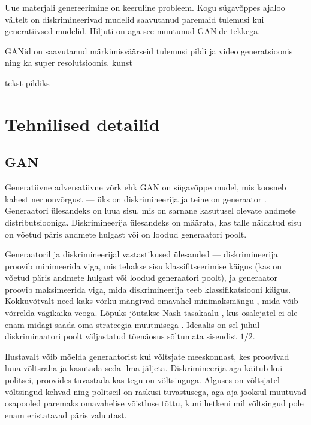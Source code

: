\documentclass{vilgym}
\begin{document}
    Uue materjali genereerimine on keeruline probleem. Kogu sügavõppes ajaloo vältelt on diskrimineerivad mudelid saavutanud paremaid tulemusi kui generatiivsed mudelid. Hiljuti on aga see muutunud GANide tekkega.

    GANid on saavutanud märkimisväärseid tulemusi pildi ja video generatsioonis ning ka super resolutsioonis. kunst

    tekst pildiks

    \section{Tehnilised detailid}
    \subsection{GAN}
    Generatiivne adversatiivne võrk ehk GAN  on sügavõppe mudel, mis koosneb kahest neruonvõrgust --- üks on diskrimineerija  ja teine on generaator .  Generaatori ülesandeks on luua sisu, mis on sarnane kasutusel olevate andmete distributsiooniga. Diskrimineerija ülesandeks on määrata, kas talle näidatud sisu on võetud päris andmete hulgast või on loodud generaatori poolt.
    
    Generaatoril ja diskrimineerijal vastastikused ülesanded --- diskrimineerija proovib minimeerida viga, mis tehakse sisu klassifitseerimise käigus (kas on võetud päris andmete hulgast või loodud generaatori poolt), ja generaator proovib maksimeerida viga, mida diskrimineerija teeb klassifikatsiooni käigus. Kokkuvõtvalt need kaks võrku mängivad omavahel minimaksmängu , mida võib võrrelda vägikaika veoga. Lõpuks jõutakse Nash tasakaalu , kus osalejatel ei ole enam midagi saada oma strateegia muutmisega \parencite{gametheory}. Ideaalis on sel juhul diskriminaatori poolt väljastatud tõenäosus  sõltumata sisendist $ 1/2 $.

    Ilustavalt võib mõelda generaatorist kui võltsjate meeskonnast, kes proovivad luua võltsraha ja kasutada seda ilma jäljeta. Diskrimineerija aga käitub kui politsei, proovides tuvastada kas tegu on võltsinguga. Alguses on võltsjatel võltsingud kehvad ning politseil on raskusi tuvastusega, aga aja jooksul muutuvad osapooled paremaks omavahelise võistluse tõttu, kuni hetkeni mil võltsingud pole enam eristatavad päris valuutast.
\end{document}
